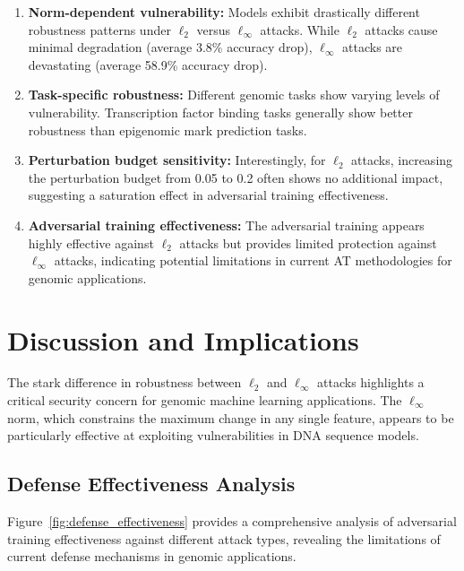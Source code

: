 \documentclass{article} %
\begin{document}
\begin{enumerate}
    \item \textbf{Norm-dependent vulnerability:} Models exhibit drastically different robustness patterns under $\ell_2$ versus $\ell_\infty$ attacks. While $\ell_2$ attacks cause minimal degradation (average 3.8\% accuracy drop), $\ell_\infty$ attacks are devastating (average 58.9\% accuracy drop).
    
    \item \textbf{Task-specific robustness:} Different genomic tasks show varying levels of vulnerability. Transcription factor binding tasks generally show better robustness than epigenomic mark prediction tasks.
    
    \item \textbf{Perturbation budget sensitivity:} Interestingly, for $\ell_2$ attacks, increasing the perturbation budget from 0.05 to 0.2 often shows no additional impact, suggesting a saturation effect in adversarial training effectiveness.
    
    \item \textbf{Adversarial training effectiveness:} The adversarial training appears highly effective against $\ell_2$ attacks but provides limited protection against $\ell_\infty$ attacks, indicating potential limitations in current AT methodologies for genomic applications.
\end{enumerate}

\section{Discussion and Implications}

The stark difference in robustness between $\ell_2$ and $\ell_\infty$ attacks highlights a critical security concern for genomic machine learning applications. The $\ell_\infty$ norm, which constrains the maximum change in any single feature, appears to be particularly effective at exploiting vulnerabilities in DNA sequence models.

\subsection{Defense Effectiveness Analysis}

Figure~\ref{fig:defense_effectiveness} provides a comprehensive analysis of adversarial training effectiveness against different attack types, revealing the limitations of current defense mechanisms in genomic applications.
\end{document}

